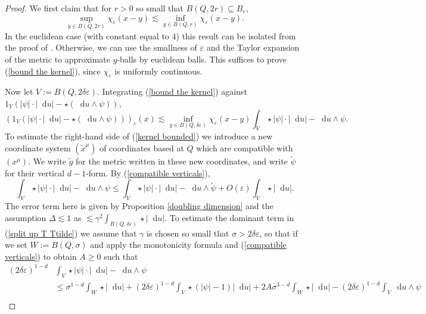 \documentclass[reqno,10pt]{amsart}
\newcommand*\dif{\mathop{}\!\mathrm{d}}
\theoremstyle{definition}
\numberwithin{equation}{section}
\begin{document}
\begin{proof}
We first claim that for $r > 0$ so small that $B(Q, 2r) \subseteq B_\varepsilon$,
\begin{equation}\label{bound the kernel}
\sup_{y \in B(Q, 2r)} \chi_\varepsilon(x - y) \lesssim \inf_{y \in B(Q, r)} \chi_\varepsilon(x - y).
\end{equation}
In the euclidean case (with constant equal to $4$) this result can be isolated from the proof of \cite[Theorem 7.3]{Giusti77}.
Otherwise, we can use the smallness of $\varepsilon$ and the Taylor expansion of the metric to approximate $g$-balls by euclidean balls.
This suffices to prove (\ref{bound the kernel}), since $\chi_\varepsilon$ is uniformly continuous.

Now let $V := B(Q, 2\delta\varepsilon)$.
Integrating (\ref{bound the kernel}) against $1_V(|\psi| \cdot |\dif u| - \star(\dif u \wedge \psi))$,
\begin{equation}\label{kernel bounded}
(1_V(|\psi| \cdot |\dif u| - \star(\dif u \wedge \psi)))_\varepsilon(x) \lesssim \inf_{y \in B(Q, \delta\varepsilon)} \chi_\varepsilon(x - y) \int_V \star |\psi| \cdot |\dif u| - \dif u \wedge \psi.
\end{equation}
To estimate the right-hand side of (\ref{kernel bounded}) we introduce a new coordinate system $(\tilde x^\mu)$ of coordinates based at $Q$ which are compatible with $(x^\mu)$.
We write $\tilde g$ for the metric written in these new coordinates, and write $\tilde \psi$ for their vertical $d-1$-form.
By (\ref{compatible verticals}),
\begin{equation}\label{split up T Ttilde}
\int_V \star |\psi| \cdot |\dif u| - \dif u \wedge \psi \leq \int_V \star |\psi| \cdot |\dif u| - \dif u \wedge \tilde \psi + O(\varepsilon) \int_V \star |\dif u|.
\end{equation}
The error term here is given by Proposition \ref{doubling dimension} and the assumption $\Delta \lesssim 1$ as $\lesssim \gamma^2 \int_{B(Q, \delta\varepsilon)} \star |\dif u|$.
To estimate the dominant term in (\ref{split up T Ttilde}) we assume that $\gamma$ is chosen so small that $\sigma > 2\delta\varepsilon$, so that if we set $W := B(Q, \sigma)$ and apply the monotonicity formula and (\ref{compatible verticals}) to obtain $A \geq 0$ such that
\begin{align*}
(2\delta\varepsilon)^{1 - d} &\int_V \star |\psi| \cdot |\dif u| - \dif u \wedge \psi \\
&\leq \sigma^{1 - d}\int_W \star |\dif u| + (2\delta\varepsilon)^{1 - d} \int_V \star(|\psi| - 1)|\dif u| + 2A\sigma^{3 - d} \int_W \star |\dif u| - (2\delta\varepsilon)^{1 - d}\int_V \dif u \wedge \psi\\

\end{align*}
\end{proof}
\end{document}
